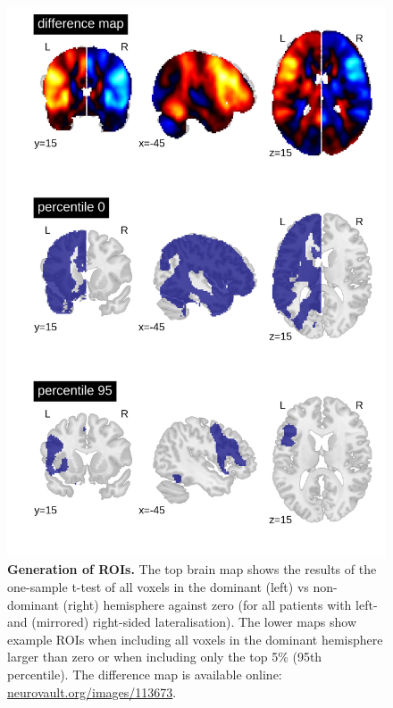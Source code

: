 \documentclass[fleqn,10pt]{SelfArx} %
\begin{document}
\begin{figure}[!htb]	
	\renewcommand{\familydefault}{\sfdefault}\normalfont
	\centering
	\includegraphics[width=\columnwidth]{../reports/figures/04-roi-generation.png}
	\caption{\textbf{Generation of ROIs.}  The top brain map shows the results of the one-sample t-test of all voxels in the dominant (left) vs non-dominant (right) hemisphere against zero (for all patients with left- and (mirrored) right-sided lateralisation). The lower maps show example ROIs when including all voxels in the dominant hemisphere larger than zero or when including only the top 5\% (95th percentile). The difference map is available online: \href{https://neurovault.org/images/113673/}{neurovault.org/images/113673}.}%
	\label{fig:roi}
\end{figure}
\end{document}
